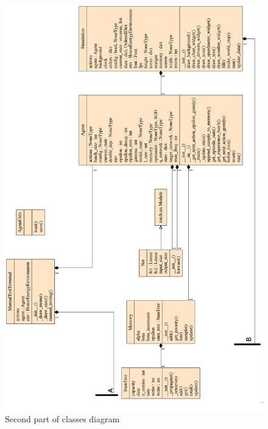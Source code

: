 \documentclass{article}
\begin{document}
\begin{figure}[H]
    \begin{center}
        \includegraphics[scale=0.5]{classes2.png}
        \caption{Second part of classes diagram}
    \end{center}
\end{figure}
\end{document}
